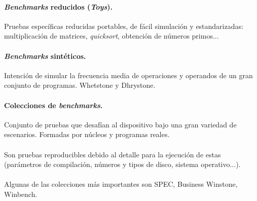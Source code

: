 \documentclass{article}
\begin{document}
\begin{multicols}{2}
		\paragraph{\textit{Benchmarks} reducidos (\textit{Toys}).}
		Pruebas específicas reducidas portables, de fácil simulación y estandarizadas: multiplicación de matrices, \textit{quicksort}, obtención de números primos...
		
		\paragraph{\textit{Benchmarks} sintéticos.}
		Intención de simular la frecuencia media de operaciones y operandos de un gran conjunto de programas. Whetstone y Dhrystone.
		
		\paragraph{Colecciones de \textit{benchmarks}.}
		 Conjunto de pruebas que desafían al dispositivo bajo una gran variedad de escenarios. Formadas por núcleos y programas reales. 
		 \paragraph{}
		 Son pruebas reproducibles debido al detalle para la ejecución de estas (parámetros de compilación, números y tipos de disco, sistema operativo...).
		 \paragraph{}
		 Algunas de las colecciones más importantes son SPEC, Business Winstone, Winbench. 
		
	\end{multicols}
	
\end{document}
